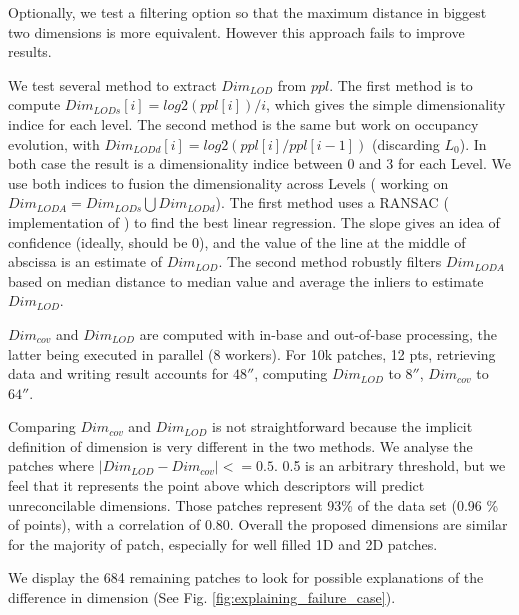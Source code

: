 		Optionally, we test a filtering option so that the maximum distance in biggest two dimensions is more equivalent. However this approach fails to improve results.
		
		We test several method to extract $Dim_{LOD}$ from $ppl$.
		The first method is to compute $ Dim_{LODs}[i] = log2(ppl[i])/i$,
		which gives the simple dimensionality indice for each level.
		The second method is the same but work on occupancy evolution, with
		$Dim_{LODd}[i] = log2(ppl[i]/ppl[i-1])$ (discarding $L_0$).
		In both case the result is a dimensionality indice between 0 and 3 for each Level.
		We use both indices to fusion the dimensionality across Levels (  working on $Dim_{LODA} = Dim_{LODs}\bigcup Dim_{LODd}$).
		The first method uses a RANSAC (\cite{SciPy2014} implementation of \cite{Choi2009}) 
		to find the best linear regression. The slope gives an idea of confidence (ideally, should be 0),
		and the value of the line at the middle of abscissa is an estimate of $Dim_{LOD}$.
		The second method robustly filters $Dim_{LODA}$ based on median distance to median value and
		average the inliers to estimate $Dim_{LOD}$.
		
		$Dim_{cov}$ and $Dim_{LOD}$ are computed with in-base and out-of-base processing, the latter 
		being executed in parallel (8 workers).
		For 10k patches, 12 \mega pts, retrieving data and writing result accounts for $48\second$, computing $Dim_{LOD}$ to $8\second$, $Dim_{cov}$ to $64\second$.
		
		Comparing $Dim_{cov}$ and $Dim_{LOD}$ is not straightforward because the implicit definition of dimension is very different in the two methods.
		We analyse the patches where $\lvert Dim_{LOD} -  Dim_{cov}\rvert <=0.5$.
		0.5 is an arbitrary threshold,
		but we feel that it represents the point above which descriptors will predict unreconcilable dimensions.
		Those patches represent 93\% of the data set (0.96 \% of points), with a correlation of 0.80.
		Overall the proposed dimensions are similar for the majority of patch, especially for well filled 1D and 2D patches.
		
		
		We display the 684 remaining patches to look for possible explanations of the difference in dimension (See Fig. \ref{fig:explaining_failure_case}).
		
